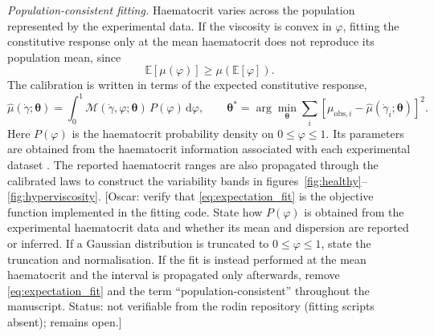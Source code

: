 \documentclass[lineno]{jfm}
\begin{document}
\medskip
\noindent\textit{Population-consistent fitting.}
Haematocrit varies across the population represented by the experimental data.
If the viscosity is convex in $\varphi$, fitting the constitutive response only
at the mean haematocrit does not reproduce its population mean, since
\[
\mathbb{E}[\mu(\varphi)]
\geq
\mu\!\left(\mathbb{E}[\varphi]\right).
\]
The calibration is written in terms of the expected constitutive response,
\begin{equation}
\hat\mu(\dot\gamma;\boldsymbol\theta)
=
\int_0^1
\mathcal{M}(\dot\gamma,\varphi;\boldsymbol\theta)\,
P(\varphi)\,\mathrm{d}\varphi,
\qquad
\boldsymbol\theta^{*}
=
\arg\min_{\boldsymbol\theta}
\sum_i
\left[
\mu_{\mathrm{obs},i}
-
\hat\mu(\dot\gamma_i;\boldsymbol\theta)
\right]^2 .
\label{eq:expectation_fit}
\end{equation}
Here $P(\varphi)$ is the haematocrit probability density on
$0\leq\varphi\leq1$. Its parameters are obtained from the haematocrit
information associated with each experimental dataset
\citep{cho2008hemorheological}. The reported haematocrit ranges are also
propagated through the calibrated laws to construct the variability bands in
figures~\ref{fig:healthy}--\ref{fig:hyperviscosity}.
{\color{red}[Oscar: verify that \eqref{eq:expectation_fit} is the objective
function implemented in the fitting code. State how $P(\varphi)$ is obtained
from the experimental haematocrit data and whether its mean and dispersion are
reported or inferred. If a Gaussian distribution is truncated to
$0\leq\varphi\leq1$, state the truncation and normalisation. If the fit is
instead performed at the mean haematocrit and the interval is propagated only
afterwards, remove \eqref{eq:expectation_fit} and the term
``population-consistent'' throughout the manuscript.
{\color{blue}Status: not verifiable from the rodin repository (fitting
scripts absent); remains open.}]}
\end{document}
